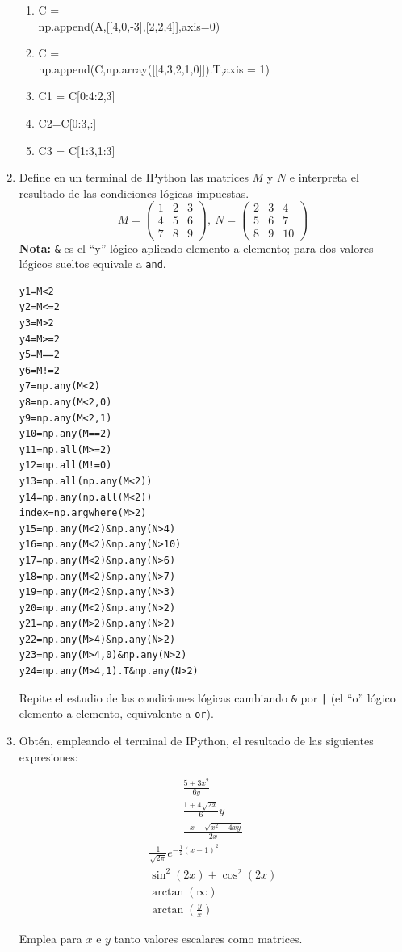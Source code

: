 \begin{enumerate}
\begin{multicols}{2}
{\begin{enumerate}
\item {\footnotesize C = \\ np.append(A,[[4,0,-3],[2,2,4]],axis=0)}
\item {\footnotesize C = \\ np.append(C,np.array([[4,3,2,1,0]]).T,axis = 1)}
\item C1 = C[0:4:2,3]
\item C2=C[0:3,:]
\item C3 = C[1:3,1:3]
\end{enumerate}
}
\end{multicols}
\item Define en un terminal de IPython las matrices $M$ y $N$ e interpreta el resultado de las condiciones lógicas impuestas.
\begin{equation*}
M =\begin{pmatrix}
1&2&3\\
4&5&6\\
7&8&9
\end{pmatrix}, \ N=\begin{pmatrix}
2&3&4\\
5&6&7\\
8&9&10
\end{pmatrix}
\end{equation*}
\textbf{Nota:} \texttt{&} es el ``y'' lógico aplicado elemento a elemento; para dos valores lógicos sueltos equivale a \texttt{and}.
\begin{verbatim}
y1=M<2
y2=M<=2
y3=M>2
y4=M>=2
y5=M==2
y6=M!=2
y7=np.any(M<2)
y8=np.any(M<2,0)
y9=np.any(M<2,1)
y10=np.any(M==2)
y11=np.all(M>=2)
y12=np.all(M!=0)
y13=np.all(np.any(M<2))
y14=np.any(np.all(M<2))
index=np.argwhere(M>2)
y15=np.any(M<2)&np.any(N>4)
y16=np.any(M<2)&np.any(N>10)
y17=np.any(M<2)&np.any(N>6)
y18=np.any(M<2)&np.any(N>7)
y19=np.any(M<2)&np.any(N>3)
y20=np.any(M<2)&np.any(N>2)
y21=np.any(M>2)&np.any(N>2)
y22=np.any(M>4)&np.any(N>2)
y23=np.any(M>4,0)&np.any(N>2)
y24=np.any(M>4,1).T&np.any(N>2)
\end{verbatim}
Repite el estudio de las condiciones lógicas cambiando \texttt{&} por \texttt{|} (el ``o'' lógico elemento a elemento, equivalente a \texttt{or}).
\item Obtén, empleando el terminal de IPython, el resultado de las siguientes expresiones:
\begin{multicols}{2}
\begin{align*}
\frac{5+3x^2}{6y}\\
\frac{1+4\sqrt{2x}}{6}y \\
\frac{-x+\sqrt{x^2-4xy}}{2x}
\end{align*}
\begin{align*}
\frac{1}{\sqrt{2\pi}}e^{-\frac{1}{2}(x-1)^2}\\
\sin^2(2x)+\cos^2(2x) \\
\arctan(\infty)\\
\arctan\left(\frac{y}{x}\right)
\end{align*}
\end{multicols}
Emplea para $x$ e $y$ tanto valores escalares como matrices.


\end{enumerate}
